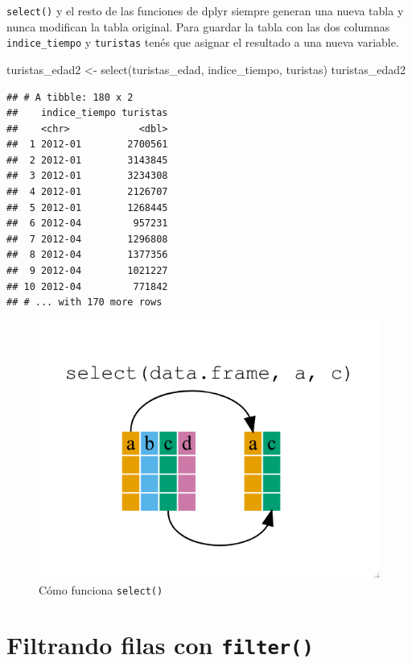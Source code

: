 \documentclass[
  openany]{book}
\newenvironment{Shaded}{\begin{snugshade}}{\end{snugshade}}
\newcommand{\FunctionTok}[1]{\textcolor[rgb]{0.00,0.00,0.00}{#1}}
\newcommand{\NormalTok}[1]{#1}
\newcommand{\OtherTok}[1]{\textcolor[rgb]{0.56,0.35,0.01}{#1}}
\begin{document}
\texttt{select()} y el resto de las funciones de dplyr siempre generan una nueva tabla y nunca modifican la tabla original.
Para guardar la tabla con las dos columnas \texttt{indice\_tiempo} y \texttt{turistas} tenés que asignar el resultado a una nueva variable.

\begin{Shaded}
\begin{Highlighting}[]
\NormalTok{turistas\_edad2 }\OtherTok{\textless{}{-}} \FunctionTok{select}\NormalTok{(turistas\_edad, indice\_tiempo, turistas)}
\NormalTok{turistas\_edad2}
\end{Highlighting}
\end{Shaded}

\begin{verbatim}
## # A tibble: 180 x 2
##    indice_tiempo turistas
##    <chr>            <dbl>
##  1 2012-01        2700561
##  2 2012-01        3143845
##  3 2012-01        3234308
##  4 2012-01        2126707
##  5 2012-01        1268445
##  6 2012-04         957231
##  7 2012-04        1296808
##  8 2012-04        1377356
##  9 2012-04        1021227
## 10 2012-04         771842
## # ... with 170 more rows
\end{verbatim}

\begin{figure}
\centering
\includegraphics{img/dplyr-select.png}
\caption{Cómo funciona \texttt{select()}}
\end{figure}

\hypertarget{filtrando-filas-con-filter}{%
\section{\texorpdfstring{Filtrando filas con \texttt{filter()}}{Filtrando filas con filter()}}\label{filtrando-filas-con-filter}}
\end{document}
